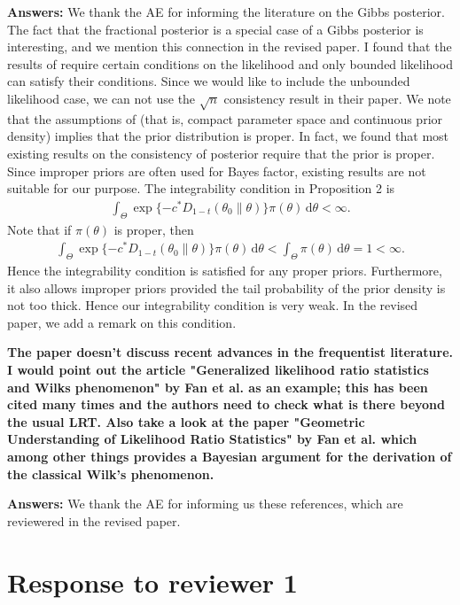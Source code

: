 \documentclass[11pt]{article}
\theoremstyle{plain}
\theoremstyle{definition}
\theoremstyle{remark}
\begin{document}
\textbf{Answers:}
We thank the AE for informing the literature on the Gibbs posterior.
The fact that the fractional posterior is a special case of a Gibbs posterior is interesting, and we mention this connection in the revised paper.
I found that the results of \cite{Chernozhukov2003} require certain conditions on the likelihood and only bounded likelihood can satisfy their conditions.
Since we would like to include the unbounded likelihood case, we can not use the $\sqrt{n}$ consistency result in their paper.
We note that the assumptions of \cite{Chernozhukov2003} (that is, compact parameter space and continuous prior density) implies that the prior distribution is proper.
In fact, we found that most existing results on the consistency of posterior require that the prior is proper.
Since improper priors are often used for Bayes factor, existing results are not suitable for our purpose.
The integrability condition in Proposition 2 is
\begin{align*}
    \int_{\Theta} \exp\{ - c^* D_{1-t}(\theta_0 \| \theta )\} \pi(\theta) \, \mathrm d \theta < \infty.
\end{align*}
Note that if $\pi(\theta)$ is proper, then
\begin{align*}
    \int_{\Theta} \exp\{ - c^* D_{1-t}(\theta_0 \| \theta )\} \pi(\theta) \, \mathrm d \theta <
    \int_{\Theta} \pi(\theta) \, \mathrm d \theta = 1 < \infty.
\end{align*}
Hence the integrability condition is satisfied for any proper priors.
Furthermore, it also allows improper priors provided the tail probability of the prior density is not too thick.
Hence our integrability condition is very weak.
In the revised paper, we add a remark on this condition.


\textbf{
    The paper doesn't discuss recent advances in the frequentist literature. I would point out the article "Generalized likelihood ratio statistics and Wilks phenomenon" by Fan et al. as an example; this has been cited many times and the authors need to check what is there beyond the usual LRT. Also take a look at the paper "Geometric Understanding of Likelihood Ratio Statistics" by Fan et al. which among other things provides a Bayesian argument for the derivation of the classical Wilk's phenomenon.
}

\textbf{Answers:}
We thank the AE for informing us these references, which are reviewered in the revised paper.

\section{Response to reviewer 1}
\end{document}
